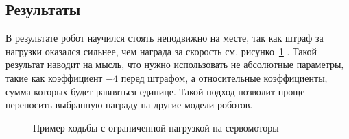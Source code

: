 \subsection{Результаты}\label{sec:ch4.2/sec5}
В результате робот научился стоять неподвижно на месте, так как штраф за нагрузки оказался сильнее, чем награда за скорость см. рисунко~\cref{fig:robot_4.4} . Такой результат наводит на мысль, что нужно использовать не абсолютные параметры, такие как коэффициент $-4$ перед штрафом, а относительные коэффициенты, сумма которых будет равняться единице. Такой подход позволит проще переносить выбранную награду на другие модели роботов.
\begin{figure}[ht]
    \caption[Пример ходьбы с ограниченной нагрузкой на сервомоторы]{Пример ходьбы с ограниченной нагрузкой на сервомоторы}\label{fig:robot_4.4}
\end{figure}


